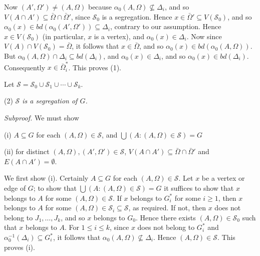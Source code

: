 Now $(A', \Omega') \neq (A, \Omega)$ because $\alpha_0(A, \Omega) \nsubseteq \Delta_i$, and so $V(A \cap A') \subseteq \bar{\Omega} \cap \bar{\Omega}'$, since $\mathscr{S}_0$ is a segregation. Hence $x \in \bar{\Omega}' \subseteq V(\mathscr{S}_0)$, and so $\alpha_0(x) \in bd(\alpha_0(A', \Omega')) \subseteq \Delta_i$, contrary to our assumption. Hence $x \in V(\mathscr{S}_0)$ (in particular, $x$ is a vertex), and $\alpha_0(x) \in \Delta_i$. Now since $V(A) \cap V(\mathscr{S}_0) = \bar{\Omega}$, it follows that $x \in \bar{\Omega}$, and so $\alpha_0(x) \in bd(\alpha_0(A, \Omega))$. But $\alpha_0(A, \Omega) \cap \Delta_i \subseteq bd(\Delta_i)$, and $\alpha_0(x) \in \Delta_i$, and so $\alpha_0(x) \in bd(\Delta_i)$. Consequently $x \in \bar{\Omega}_i^*$. This proves (1).

Let $\mathscr{S} = \mathscr{S}_0 \cup \mathscr{S}_1 \cup \cdots \cup \mathscr{S}_k$.

\hspace*{12pt}(2) \textit{$\mathscr{S}$ is a segregation of $G$.}

\textit{Subproof.} We must show

\hspace*{12pt}(i) $A \subseteq G$ for each $(A, \Omega) \in \mathscr{S}$, and $\bigcup (A : (A, \Omega) \in \mathscr{S}) = G$

\hspace*{12pt}(ii) for distinct $(A, \Omega), (A', \Omega') \in \mathscr{S}$, $V(A \cap A') \subseteq \bar{\Omega} \cap \bar{\Omega}'$ and $E(A \cap A') = \emptyset$.

We first show (i). Certainly $A \subseteq G$ for each $(A, \Omega) \in \mathscr{S}$. Let $x$ be a vertex or edge of $G$; to show that $\bigcup (A : (A, \Omega) \in \mathscr{S}) = G$ it suffices to show that $x$ belongs to $A$ for some $(A, \Omega) \in \mathscr{S}$. If $x$ belongs to $G_i^*$ for some $i \ge 1$, then $x$ belongs to $A$ for some $(A, \Omega) \in \mathscr{S}_i \subseteq \mathscr{S}$, as required. If not, then $x$ does not belong to $J_1, \dots, J_k$, and so $x$ belongs to $G_0$. Hence there exists $(A, \Omega) \in \mathscr{S}_0$ such that $x$ belongs to $A$. For $1 \le i \le k$, since $x$ does not belong to $G_i^*$ and $\alpha_0^{-1}(\Delta_i) \subseteq G_i^*$, it follows that $\alpha_0(A, \Omega) \nsubseteq \Delta_i$. Hence $(A, \Omega) \in \mathscr{S}$. This proves (i).


